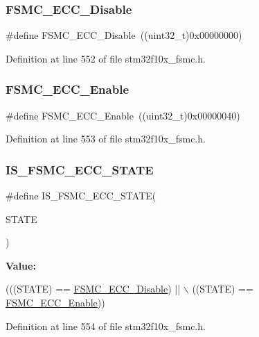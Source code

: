 \subsubsection{\texorpdfstring{F\+S\+M\+C\+\_\+\+E\+C\+C\+\_\+\+Disable}{FSMC\_ECC\_Disable}}
{\footnotesize\ttfamily \#define F\+S\+M\+C\+\_\+\+E\+C\+C\+\_\+\+Disable~((uint32\+\_\+t)0x00000000)}



Definition at line 552 of file stm32f10x\+\_\+fsmc.\+h.

\mbox{\label{group___f_s_m_c___e_c_c_ga9d940243830695412d4c98228bb5b763}} 
\subsubsection{\texorpdfstring{F\+S\+M\+C\+\_\+\+E\+C\+C\+\_\+\+Enable}{FSMC\_ECC\_Enable}}
{\footnotesize\ttfamily \#define F\+S\+M\+C\+\_\+\+E\+C\+C\+\_\+\+Enable~((uint32\+\_\+t)0x00000040)}



Definition at line 553 of file stm32f10x\+\_\+fsmc.\+h.

\mbox{\label{group___f_s_m_c___e_c_c_gaf1a7cb45edd8707bf4ea8aac96799c77}} 
\subsubsection{\texorpdfstring{I\+S\+\_\+\+F\+S\+M\+C\+\_\+\+E\+C\+C\+\_\+\+S\+T\+A\+TE}{IS\_FSMC\_ECC\_STATE}}
{\footnotesize\ttfamily \#define I\+S\+\_\+\+F\+S\+M\+C\+\_\+\+E\+C\+C\+\_\+\+S\+T\+A\+TE(\begin{DoxyParamCaption}\item[{}]{S\+T\+A\+TE }\end{DoxyParamCaption})}

{\bfseries Value\+:}
\begin{DoxyCode}
(((STATE) == \hyperlink{group___f_s_m_c___e_c_c_ga9a3264c0718f5023fd106abea7ef806d}{FSMC\_ECC\_Disable}) || \(\backslash\)
                                  ((STATE) == \hyperlink{group___f_s_m_c___e_c_c_ga9d940243830695412d4c98228bb5b763}{FSMC\_ECC\_Enable}))
\end{DoxyCode}


Definition at line 554 of file stm32f10x\+\_\+fsmc.\+h.

